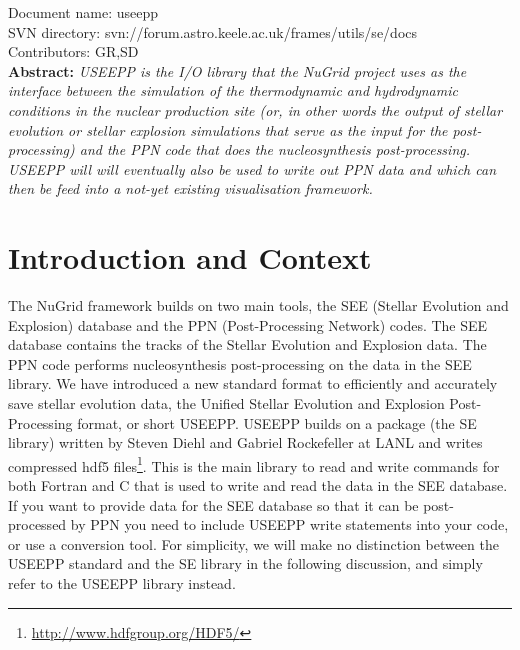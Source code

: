 \renewcommand{\ndoctitle}{USEEPP: The Unified Stellar Evolution and Explosion Post-Processing library} 
\renewcommand{\ndocname}{useepp}                      
\renewcommand{\svndir}{svn://forum.astro.keele.ac.uk/frames/utils/se/docs}  
\renewcommand{\ndoccontribs}{GR,SD}



Document name: \ndocname \\
SVN directory: \svndir\\
Contributors: \ndoccontribs\\

{ \textbf{Abstract:} \slshape USEEPP  is the I/O library
that the NuGrid project uses as the interface between the simulation
of the thermodynamic and hydrodynamic conditions in the nuclear
production site (or, in other words the output of stellar evolution or
stellar explosion simulations that serve as the input for the
post-processing) and the PPN code that does the nucleosynthesis
post-processing. USEEPP will will eventually also be used to write out
PPN data and which can then be feed into a not-yet existing
visualisation framework.}

\maketitle



\section{Introduction and Context}


The NuGrid framework builds on two main tools, the SEE (Stellar Evolution and Explosion) database and the PPN (Post-Processing Network) codes. The SEE database contains the tracks of the Stellar Evolution and Explosion data. The PPN code performs nucleosynthesis post-processing on the data in the SEE library. We have introduced a new standard format to efficiently and accurately save stellar evolution data, the Unified Stellar Evolution and Explosion Post-Processing format, or short USEEPP.
USEEPP builds on a package (the SE library) written by Steven Diehl and Gabriel Rockefeller at LANL and writes compressed hdf5 files\footnote{\url{http://www.hdfgroup.org/HDF5/}}. This is the main library to read and write commands for both Fortran and C that is used to write and read the data in the SEE database. If you want to provide data for the SEE database so that it can be post-processed by
PPN you need to include USEEPP write statements into your code, or use a conversion tool. For simplicity, we will make no distinction between the USEEPP standard and the SE library in the following discussion, and simply refer to the USEEPP library instead.


